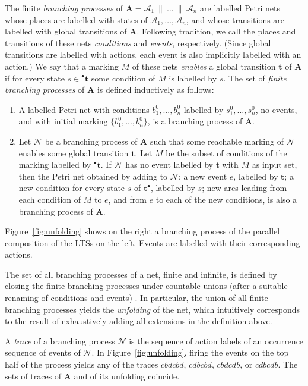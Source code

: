 \documentclass{llncs}
\def\A{\mathcal{A}}
\def\prod{\mathbf{A}}
\def\t{\mathbf{t}}
\newcommand{\inp}[1]{{}^\bullet\!{#1}}
\newcommand{\out}[1]{{#1}^\bullet}
\def\N{\mathcal{N}}
\begin{document}
The finite \emph{branching processes} of $\prod=\A_1~\parallel~\ldots~\parallel~\A_n$
are labelled Petri nets whose places are labelled with states of $\A_1,\dots,\A_n$, and 
whose transitions are labelled with global transitions of $\prod$. Following tradition, 
we call the places and transitions of these nets {\em conditions} and {\em events}, respectively.
 (Since global transitions are labelled with 
actions, each event is also implicitly labelled with an action.)
We say that a marking $M$ of these nets {\em enables} a global transition 
$\t$ of $\prod$ if for every state $s \in \inp{\t}$ some condition of $M$ is labelled by $s$. 
The set of {\em finite branching processes} of $\prod$ is defined inductively as follows:
\begin{enumerate}
\item A labelled Petri net with conditions $b_1^0, ..., b_n^0$ labelled by $s_1^0, \ldots, s_n^0$, 
no events, and  
with initial marking $\{b_1^0, ..., b_n^0\}$,
is a branching process of $\prod$.
\item Let $\N$ be a branching process of $\prod$ such that some reachable marking of $\N$ enables some  
global transition $\t$. Let $M$ be the subset of conditions of the marking labelled by $\inp{\t}$. 
If $\N$ has no event labelled by $\t$ with $M$ as input set, then the Petri net
obtained by adding to $\N$: a new event $e$, labelled by $\t$; a new condition for every state $s$ of 
$\out{\t}$, labelled by $s$; new arcs leading from each condition of $M$ to $e$, and from $e$ to each 
of the new conditions, is also a branching process of $\prod$. 
\end{enumerate}
Figure~\ref{fig:unfolding} shows on the right a branching process 
of the parallel composition of the LTSs on the left. Events are labelled with their corresponding actions.

The set of all branching processes of a net, finite and infinite, is defined by
closing the finite branching processes under countable unions (after a suitable renaming of conditions and events) \cite{Esparza08}.
In particular, the union of 
all finite branching processes yields the {\em unfolding} of the net, which 
intuitively corresponds to the result of exhaustively adding all extensions in the definition above. 

A {\em trace} of a branching process $\N$ is the sequence of action labels of an occurrence sequence of events of $\N$. In Figure~\ref{fig:unfolding},
firing the events on the top half of the process yields any of the traces 
$cbdcbd$, $cdbcbd$, $cbdcdb$, or $cdbcdb$.
The sets of traces of $\prod$
and of its unfolding coincide.
\end{document}
